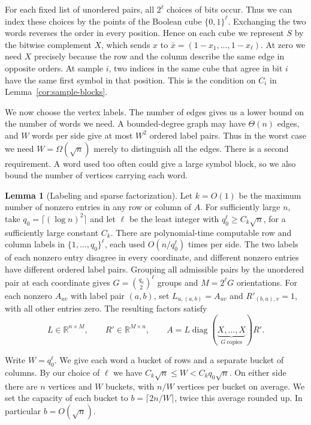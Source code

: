 \documentclass{article}
\theoremstyle{definition}
\newtheorem{lemma}[theorem]{Lemma}
\DeclareMathOperator{\diag}{diag}
\begin{document}
For each fixed list of unordered pairs, all \(2^\ell\) choices of
bits occur. Thus we can index these choices by the points of the
Boolean cube \(\{0,1\}^\ell\). Exchanging the two words reverses the order in every
position. Hence on each cube we represent \(S\) by the bitwise
complement \(X\), which sends \(x\) to \(\bar x=(1-x_1,\ldots,1-x_\ell)\). At zero we need \(X\)
precisely because the row and the column describe the same edge in
opposite orders. At sample \(i\), two indices in the same cube that
agree in bit \(i\) have the same first symbol in that position. This
is the condition on \(C_i\) in Lemma~\ref{cor:sample-blocks}.

We now choose the vertex labels. The number of edges gives us a lower
bound on the number of words we need.
A bounded-degree graph may have
\(\Theta(n)\) edges, and \(W\) words per side give at most \(W^2\)
ordered label pairs. Thus in the worst case we need
\(W=\Omega(\sqrt n)\) merely to distinguish all the edges. There is a
second requirement. A word used too often could give a large symbol
block, so we also bound the number of vertices carrying each word.

\begin{lemma}[Labeling and sparse factorization]\label{lem:labels}
Let \(k=O(1)\) be the maximum number of nonzero entries in any row or column
of \(A\). For sufficiently large \(n\), take
\(q_0=\lceil(\log n)^2\rceil\) and let \(\ell\) be the least integer with
\(q_0^\ell\ge C_k\sqrt n\), for a sufficiently large constant \(C_k\).
There are polynomial-time computable row and column labels in
\(\{1,\ldots,q_0\}^\ell\), each used \(O(n/q_0^\ell)\) times per side.
The two labels of each nonzero entry disagree in every coordinate, and
different nonzero entries have different ordered label pairs.
Grouping all admissible pairs by the unordered pair at each coordinate gives
\(G=\binom{q_0}{2}^{\ell}\) groups and \(M=2^\ell G\) orientations.
For each nonzero \(A_{uv}\) with label pair \((a,b)\), set
\(L_{u,(a,b)}=A_{uv}\) and \(R'_{(b,a),v}=1\), with all other entries zero.
The resulting factors satisfy
\[
    L\in\mathbb R^{n\times M},\qquad
    R'\in\mathbb R^{M\times n},\qquad
    A=L\diag(\underbrace{X,\ldots,X}_{G\ \mathrm{copies}})R'.
\]
\end{lemma}

Write \(W=q_0^\ell\). We give each word a bucket of rows and a
separate bucket of columns. By our choice of \(\ell\) we have
\(C_k\sqrt n\le W<C_kq_0\sqrt n\). On either side there are \(n\)
vertices and \(W\) buckets, with \(n/W\) vertices per bucket on
average. We set the capacity of each bucket to \(b=\lceil 2n/W\rceil\), twice this average rounded up.
In particular \(b=O(\sqrt n)\).
\end{document}
